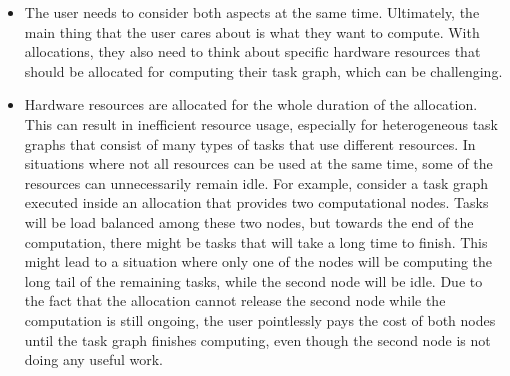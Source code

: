 \begin{itemize}
	\item The user needs to consider both aspects at the same time. Ultimately, the main thing that the user
	      cares about is what they want to compute. With allocations, they also need to think about specific
	      hardware resources that should be allocated for computing their task graph, which can be
	      challenging.
	\item Hardware resources are allocated for the whole duration of the allocation. This can result in
	      inefficient resource usage, especially for heterogeneous task graphs that consist of many types of
	      tasks that use different resources. In situations where not all resources can be used at the same
	      time, some of the resources can unnecessarily remain idle. For example, consider a task graph
	      executed inside an allocation that provides two computational nodes. Tasks will be load balanced
	      among these two nodes, but towards the end of the computation, there might be tasks that will take
	      a long time to finish. This might lead to a situation where only one of the nodes will be computing
	      the long tail of the remaining tasks, while the second node will be idle. Due to the fact that the
	      allocation cannot release the second node while the computation is still ongoing, the user
	      pointlessly pays the cost of both nodes until the task graph finishes computing, even though the
	      second node is not doing any useful work.


\end{itemize}
